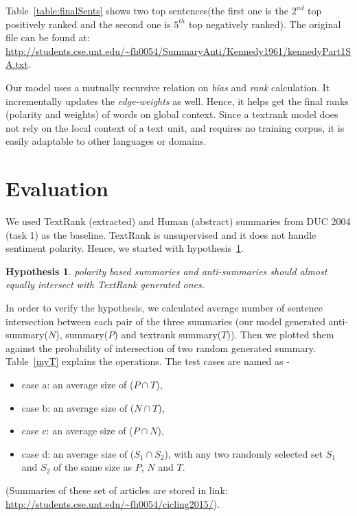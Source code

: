 \documentclass[a4paper]{report}
\newtheorem{hyp}{Hypothesis}
\begin{document}
 \vspace{-0.2in}
Table~\ref{table:finalSents} shows two top sentences(the first one is the $2^{nd}$ top positively ranked and the second one is $5^{th}$ top negatively ranked). The original file can be found at: \url{http://students.cse.unt.edu/~fh0054/SummaryAnti/Kennedy1961/kennedyPart1SA.txt}.%
\par Our model uses  a mutually recursive relation on {\em bias} and {\em rank} calculation. It incrementally updates the {\em edge-weights} as well. Hence, it helps get the final ranks (polarity and weights) of words on global context. Since a textrank model does not rely on the local context of a text unit, and requires no training corpus, it is easily adaptable to other languages or domains.

\section{Evaluation}
We used TextRank (extracted) and Human (abstract) summaries from DUC 2004 (task 1) as the baseline. TextRank is unsupervised and it does not handle sentiment polarity. Hence, we started with hypothesis~\ref{h1}.
\begin{hyp}
\label{h1}
 polarity based summaries and anti-summaries should almost equally intersect with TextRank generated ones.
 \end{hyp} 
In order to verify the hypothesis, we calculated average number of sentence intersection between each pair of the three summaries (our model generated anti-summary($N$), summary($P$) and textrank summary($T$)). Then we plotted them against the probability of intersection of two random generated summary. Table~\ref{myT} explains the operations. The test cases are named as -
\begin{itemize}
\item case a: an average size of  ($P \cap T$),  
\item case b: an average size of  ($N \cap T$),  
\item case c: an average size of  ($P \cap N$),  
\item case d: an average size of ($S_1 \cap S_2$), with any two randomly selected set $S_1$ and $S_2$ of the same size as $P$, $N$ and $T$.
\end{itemize}
(Summaries of these set of articles are stored in link: \url{http://students.cse.unt.edu/~fh0054/cicling2015/}).
\end{document}
